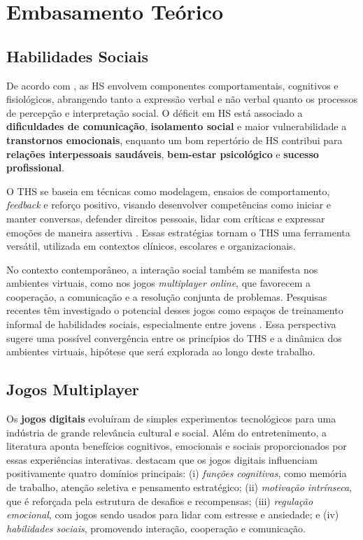 \chapter{Embasamento Teórico}
\section{Habilidades Sociais}
De acordo com , as HS envolvem componentes comportamentais, cognitivos e fisiológicos, abrangendo tanto a expressão verbal e não verbal quanto os processos de percepção e interpretação social. O déficit em HS está associado a \textbf{dificuldades de comunicação}, \textbf{isolamento social} e maior vulnerabilidade a \textbf{transtornos emocionais}, enquanto um bom repertório de HS contribui para \textbf{relações interpessoais saudáveis}, \textbf{bem-estar psicológico} e \textbf{sucesso profissional}.

O THS se baseia em técnicas como modelagem, ensaios de comportamento, \textit{feedback} e reforço positivo, visando desenvolver competências como iniciar e manter conversas, defender direitos pessoais, lidar com críticas e expressar emoções de maneira assertiva \cite{caballo2003manual}. Essas estratégias tornam o THS uma ferramenta versátil, utilizada em contextos clínicos, escolares e organizacionais.

No contexto contemporâneo, a interação social também se manifesta nos ambientes virtuais, como nos jogos \textit{multiplayer online}, que favorecem a cooperação, a comunicação e a resolução conjunta de problemas. Pesquisas recentes têm investigado o potencial desses jogos como espaços de treinamento informal de habilidades sociais, especialmente entre jovens \cite{granic2014}. Essa perspectiva sugere uma possível convergência entre os princípios do THS e a dinâmica dos ambientes virtuais, hipótese que será explorada ao longo deste trabalho.

\section{Jogos Multiplayer}

Os \textbf{jogos digitais} evoluíram de simples experimentos tecnológicos para uma indústria de grande relevância cultural e social. Além do entretenimento, a literatura aponta benefícios cognitivos, emocionais e sociais proporcionados por essas experiências interativas.   destacam que os jogos digitais influenciam positivamente quatro domínios principais: (i) \textit{funções cognitivas}, como memória de trabalho, atenção seletiva e pensamento estratégico; (ii) \textit{motivação intrínseca}, que é reforçada pela estrutura de desafios e recompensas; (iii) \textit{regulação emocional}, com jogos sendo usados para lidar com estresse e ansiedade; e (iv) \textit{habilidades sociais}, promovendo interação, cooperação e comunicação.

